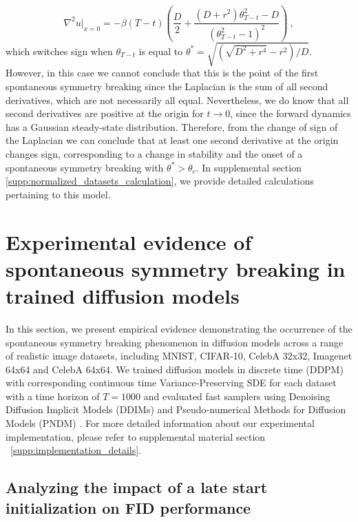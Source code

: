 \documentclass{article}
\begin{document}
\begin{equation} \label{eq: hyper-spherical laplacian}
     \nabla^2 u|_{x=0} = -\beta(T - t) \left(\frac{D}{2} +  \frac{(D + r^2) \theta_{T-t}^2 - D}{( \theta_{T-t}^2 - 1)^2} \right)~,
\end{equation}
which switches sign when $\theta_{T-t}$ is equal to $\theta^* = \sqrt{(\sqrt{D^2 + r^4} - r^2)/D}$. However, in this case we cannot conclude that this is the point of the first spontaneous symmetry breaking since the Laplacian is the sum of all second derivatives, which are not necessarily all equal. Nevertheless, we do know that all second derivatives are positive at the origin for $t \rightarrow 0$, since the forward dynamics has a Gaussian steady-state distribution. Therefore, from the change of sign of the Laplacian we can conclude that at least one second derivative at the origin changes sign, corresponding to a change in stability and the onset of a spontaneous symmetry breaking with $\theta^* > \theta_c$. In supplemental section \ref{supp:normalized_datasets_calculation}, we provide detailed calculations pertaining to this model.

\section{Experimental evidence of spontaneous symmetry breaking in trained diffusion models}


In this section, we present  empirical evidence demonstrating the occurrence of the spontaneous symmetry breaking phenomenon in diffusion models across a range of realistic image datasets, including MNIST, CIFAR-10, CelebA 32x32, Imagenet 64x64 and  CelebA 64x64. We trained diffusion models in discrete time (DDPM) with corresponding continuous time Variance-Preserving SDE for each dataset with a time horizon of $T=1000$ and evaluated fast samplers using  Denoising Diffusion Implicit Models (DDIMs) \citep{song2020denoising} and Pseudo-numerical Methods for Diffusion Models (PNDM) \citep{liu2022pseudo}. For more detailed information about our experimental implementation, please refer to supplemental material section ~\ref{supp:implementation_details}.


\subsection{Analyzing the impact of a late start initialization on FID performance}
\label{sec:qualitative}
\end{document}
